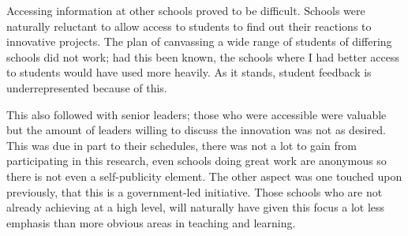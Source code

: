 Accessing information at other schools proved to be difficult. Schools were naturally reluctant to allow access to students to find out their reactions to innovative projects. The plan of canvassing a wide range of students of differing schools did not work; had this been known, the schools where I had better access to students would have used more heavily. As it stands, student feedback is underrepresented because of this. 

This also followed with senior leaders; those who were accessible were valuable but the amount of leaders willing to discuss the innovation was not as desired. This was due in part to their schedules, there was not a lot to gain from participating in this research, even schools doing great work are anonymous so there is not even a self-publicity element. The other aspect was one touched upon previously, that this is a government-led initiative. Those schools who are not already achieving at a high level, will naturally have given this focus a lot less emphasis than more obvious areas in teaching and learning. 


